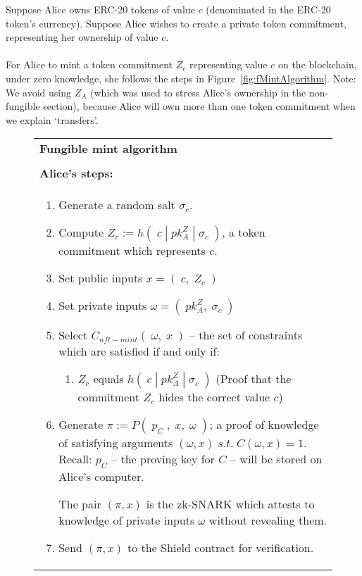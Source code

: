 \noindent
Suppose Alice owns ERC-20 tokens of value $c$
(denominated in the ERC-20 token's currency).
Suppose Alice wishes to create a private token commitment, representing her ownership of value $c$.\\
\\
For Alice to mint a token commitment $Z_c$ representing value $c$ on the blockchain, under zero knowledge, she follows the steps in Figure~\ref{fig:fMintAlgorithm}. Note: We avoid using $Z_A$ (which was used to stress Alice's ownership in the non-fungible section), because Alice will own more than one token commitment when we explain `transfers'.
\\

\begin{figure}[htp]
	\begin{center}
		\begin{framed}
      \begin{tabular}{p{16cm}}	
        \textbf{Fungible mint algorithm} \\
        \\
        \midrule
        \textbf{Alice's steps:}\\
        \begin{enumerate}
				  \item Generate a random salt $\sigma_c$.
				  \item Compute $Z_c := h(\;c\;|\;pk^Z_A\;|\;\sigma_c\;)$, a token commitment which represents $c$.
          \item Set public inputs $x = (\;c,\;Z_c\;)$
          \item Set private inputs $\omega = (\;pk_A^Z,\;\sigma_c\;)$
          \item Select $C_{nft-mint}(\;\omega,\;x\;)$ -- the set of constraints which are satisfied if and only if:
          \begin{enumerate}
            \item $Z_c$ equals $h(\;c\;|\;pk_A^Z\;|\;\sigma_c\;)$ (Proof that the commitment $Z_c$ hides the correct value $c$)
          \end{enumerate}
          \item Generate $\pi := P(\;p_C\;,\;x,\;\omega\;)$; a proof of knowledge of satisfying arguments $(\omega, x)\;s.t.\;C(\omega, x) = 1$. Recall: $p_C$ -- the proving key for $C$ -- will be stored on Alice's computer.
           
          The pair $(\pi, x)$ is the zk-SNARK which attests to knowledge of private inputs $\omega$ without revealing them.
          \item Send $(\pi, x)$ to the Shield contract for verification.
           

\end{enumerate}
\end{tabular}
\end{framed}
\end{center}
\end{figure}
